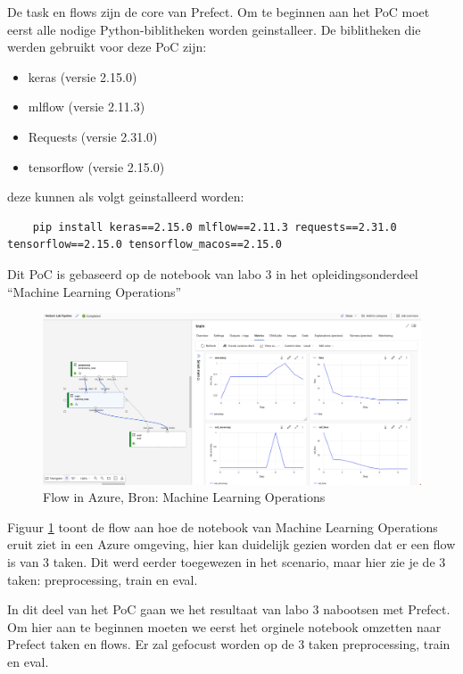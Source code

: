 De task en flows zijn de core van Prefect. Om te beginnen aan het PoC moet eerst alle nodige Python-biblitheken worden geinstalleer.
De biblitheken die werden gebruikt voor deze PoC zijn:
\begin{itemize}
    \item keras (versie 2.15.0)
    \item mlflow (versie 2.11.3)
    \item Requests (versie 2.31.0)
    \item tensorflow (versie 2.15.0)
\end{itemize}

deze kunnen als volgt geinstalleerd worden: 

\begin{verbatim}
    pip install keras==2.15.0 mlflow==2.11.3 requests==2.31.0 tensorflow==2.15.0 tensorflow_macos==2.15.0
\end{verbatim}

Dit PoC is gebaseerd op de notebook van labo 3 in het opleidingsonderdeel ``Machine Learning Operations''

\begin{figure}[h]
    \includegraphics[width=\linewidth]{download.png}
    \caption{Flow in Azure, Bron: Machine Learning Operations}
    \label{fig:Resultaten in Azure}
\end{figure}

Figuur \ref{fig:Resultaten in Azure} toont de flow aan hoe de notebook van Machine Learning Operations eruit ziet in een Azure omgeving, hier kan duidelijk gezien worden dat er een flow is van 3 taken.
Dit werd eerder toegewezen in het scenario, maar hier zie je de 3 taken: preprocessing, train en eval.

In dit deel van het PoC gaan we het resultaat van labo 3 nabootsen met Prefect.
Om hier aan te beginnen moeten we eerst het orginele notebook omzetten naar Prefect taken en flows. Er zal gefocust worden op de 3 taken preprocessing, train en eval.

